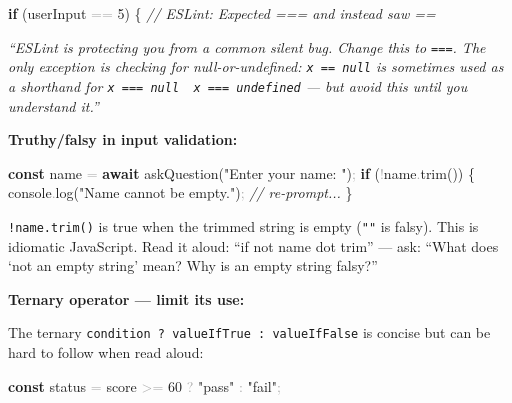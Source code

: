 \documentclass[
  justified,
  openright,
]{tufte-book}
\newcommand{\KeywordTok}[1]{\textcolor{CodeKeyword}{\textbf{#1}}}  %
\newcommand{\StringTok}[1]{\textcolor{CodeString}{#1}}              %
\newcommand{\CommentTok}[1]{\textcolor{CodeComment}{\textit{#1}}}  %
\newcommand{\CodeNumTok}[1]{\textcolor{CodeNumber}{#1}}             %
\newcommand{\CodeFuncTok}[1]{\textcolor{CodeKeyword}{#1}}           %
\newcommand{\OperatorTok}[1]{\textcolor{DarkGray}{#1}}              %
\newenvironment{Shaded}{%
  \begin{mdframed}[style=TufteCode]%
}{%
  \end{mdframed}%
}
\begin{document}
\begin{Shaded}
\begin{Highlighting}[]
\KeywordTok{if} (userInput \OperatorTok{==} \CodeNumTok{5}) \{   \CommentTok{// ESLint: Expected \textquotesingle{}===\textquotesingle{} and instead saw \textquotesingle{}==\textquotesingle{}}
\end{Highlighting}
\end{Shaded}

\emph{``ESLint is protecting you from a common silent bug. Change this
to \texttt{===}. The only exception is checking for null-or-undefined:
\texttt{x\ ==\ null} is sometimes used as a shorthand for
\texttt{x\ ===\ null\ \textbar{}\textbar{}\ x\ ===\ undefined} --- but
avoid this until you understand it.''}

\textbf{Truthy/falsy in input validation:}

\begin{Shaded}
\begin{Highlighting}[]
\KeywordTok{const} name \OperatorTok{=} \KeywordTok{await} \CodeFuncTok{askQuestion}(\StringTok{"Enter your name: "})\OperatorTok{;}
\KeywordTok{if} (\OperatorTok{!}name\OperatorTok{.}\CodeFuncTok{trim}()) \{
  console\OperatorTok{.}\CodeFuncTok{log}(\StringTok{"Name cannot be empty."})\OperatorTok{;}
  \CommentTok{// re{-}prompt...}
\}
\end{Highlighting}
\end{Shaded}

\texttt{!name.trim()} is true when the trimmed string is empty
(\texttt{""} is falsy). This is idiomatic JavaScript. Read it aloud:
``if not name dot trim'' --- ask: ``What does `not an empty string'
mean? Why is an empty string falsy?''

\textbf{Ternary operator --- limit its use:}

The ternary \texttt{condition\ ?\ valueIfTrue\ :\ valueIfFalse} is
concise but can be hard to follow when read aloud:

\begin{Shaded}
\begin{Highlighting}[]
\KeywordTok{const} status \OperatorTok{=} score \OperatorTok{\textgreater{}=} \CodeNumTok{60} \OperatorTok{?} \StringTok{"pass"} \OperatorTok{:} \StringTok{"fail"}\OperatorTok{;}
\end{Highlighting}
\end{Shaded}
\end{document}
